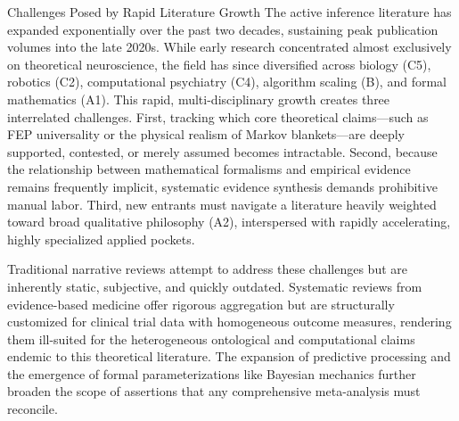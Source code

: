 \documentclass[
  ignorenonframetext,
]{beamer}
\begin{document}
\begin{frame}{Challenges Posed by Rapid Literature Growth}
\protect{}\label{challenges-posed-by-rapid-literature-growth}
The active inference literature has expanded exponentially over the past
two decades, sustaining peak publication volumes into the late 2020s.
While early research concentrated almost exclusively on theoretical
neuroscience, the field has since diversified across biology (C5),
robotics (C2), computational psychiatry (C4), algorithm scaling (B), and
formal mathematics (A1). This rapid, multi-disciplinary growth creates
three interrelated challenges. First, tracking which core theoretical
claims---such as FEP universality or the physical realism of Markov
blankets---are deeply supported, contested, or merely assumed becomes
intractable. Second, because the relationship between mathematical
formalisms and empirical evidence remains frequently implicit,
systematic evidence synthesis demands prohibitive manual labor. Third,
new entrants must navigate a literature heavily weighted toward broad
qualitative philosophy (A2), interspersed with rapidly accelerating,
highly specialized applied pockets.

Traditional narrative reviews attempt to address these challenges but
are inherently static, subjective, and quickly outdated. Systematic
reviews from evidence-based medicine offer rigorous aggregation but are
structurally customized for clinical trial data with homogeneous outcome
measures, rendering them ill-suited for the heterogeneous ontological
and computational claims endemic to this theoretical literature. The
expansion of predictive processing
\citep{clark2013whatever, hohwy2013predictive} and the emergence of
formal parameterizations like Bayesian mechanics
\citep{sakthivadivel2023bayesian} further broaden the scope of
assertions that any comprehensive meta-analysis must reconcile.
\end{frame}
\end{document}

